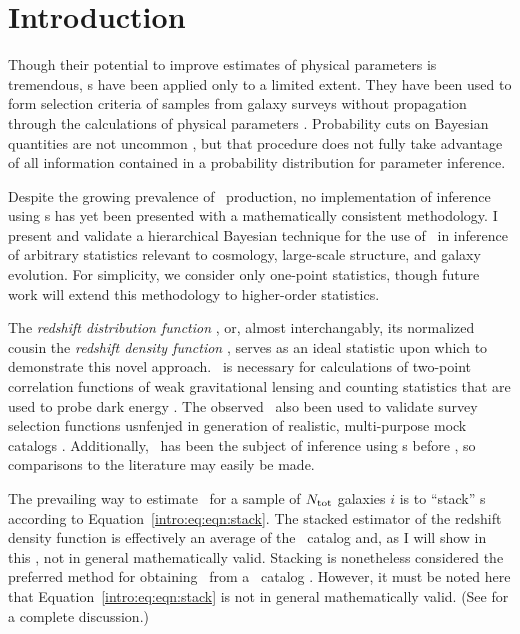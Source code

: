 \section{Introduction}

Though their potential to improve estimates of physical parameters is tremendous, \pzpdf s have been applied only to a limited extent.  
They have been used to form selection criteria of samples from galaxy surveys without propagation 
through the calculations of physical parameters \citep{VanBreukelen2009,Viironen2015}.  
Probability cuts on Bayesian quantities are not uncommon \citep{Leung2015, DiPompeo2015a}, but that procedure does not fully take advantage of all information contained in a probability distribution for parameter inference.  

Despite the growing prevalence of \pzpdf\ production, no implementation of inference using \pzpdf s has yet been presented with a mathematically consistent methodology.  
I present and validate a hierarchical Bayesian technique for the use of \pzpdf\ in inference of arbitrary statistics relevant to cosmology, large-scale structure, and galaxy evolution.  
For simplicity, we consider only one-point statistics, though future work will extend this methodology to higher-order statistics.

The \textit{redshift distribution function \Nz}, or, almost interchangably, its normalized cousin the \textit{redshift density function \nz}, serves as an ideal statistic upon which to demonstrate this novel approach.  
\Nz\ is necessary for calculations of two-point correlation functions of weak gravitational lensing and counting statistics that are used to probe dark energy \citep{Masters2015}.  
The observed \Nz\ also been used to validate survey selection functions usnfenjed in generation of realistic, multi-purpose mock catalogs \citep{Norberg2002}.  
Additionally, \Nz\ has been the subject of inference using \pzpdf s before \citep{sheldon_photometric_2012, Hildebrandt2012, Kelly2014, Benjamin2013, bonnett_using_2015, Viironen2015, Asorey2016, Leistedt2016}, so comparisons to the literature may easily be made. 

The prevailing way to estimate \nz\ for a sample of $N_{\mathrm{tot}}$ galaxies $i$ is to ``stack'' \pzpdf s according to Equation~\ref{intro:eq:eqn:stack}.
The stacked estimator of the redshift density function is effectively an average of the \pzpdf\ catalog and, as I will show in this \paper, not in general mathematically valid.
Stacking is nonetheless considered the preferred method for obtaining \Nz\ from a \pzpdf\ catalog \citep{sheldon_photometric_2012, Kelly2014, Benjamin2013, bonnett_using_2015, Viironen2015, Asorey2016}.  
However, it must be noted here that Equation~\ref{intro:eq:eqn:stack} is not in general mathematically valid.  
(See \citet{Hogg2012} for a complete discussion.)  

